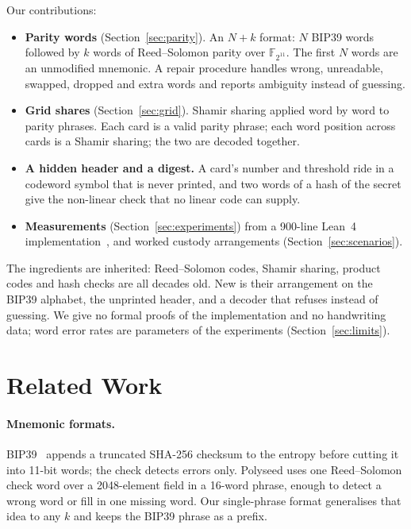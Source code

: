 \documentclass[numeric]{anvil-paper}
\newcommand{\F}{\mathbb{F}}
\begin{document}
Our contributions:
\begin{itemize}
\item \textbf{Parity words} (Section~\ref{sec:parity}). An $N{+}k$ format: $N$
  BIP39 words followed by $k$ words of Reed--Solomon parity over $\F_{2^{11}}$.
  The first $N$ words are an unmodified mnemonic. A repair procedure handles
  wrong, unreadable, swapped, dropped and extra words and reports ambiguity
  instead of guessing.
\item \textbf{Grid shares} (Section~\ref{sec:grid}). Shamir sharing applied word
  by word to parity phrases. Each card is a valid parity phrase; each word
  position across cards is a Shamir sharing; the two are decoded together.
\item \textbf{A hidden header and a digest.} A card's number and threshold ride
  in a codeword symbol that is never printed, and two words of a hash of the
  secret give the non-linear check that no linear code can supply.
\item \textbf{Measurements} (Section~\ref{sec:experiments}) from a 900-line
  Lean~4 implementation~\citep{moura2021lean}, and worked custody arrangements
  (Section~\ref{sec:scenarios}).
\end{itemize}
The ingredients are inherited: Reed--Solomon codes, Shamir sharing, product
codes and hash checks are all decades old. New is their arrangement on the BIP39
alphabet, the unprinted header, and a decoder that refuses instead of guessing.
We give no formal proofs of the implementation and no handwriting data; word
error rates are parameters of the experiments
(Section~\ref{sec:limits}).

\section{Related Work}
\label{sec:related}

\paragraph{Mnemonic formats.}
BIP39~\citep{bip39} appends a truncated SHA-256 checksum to the entropy before
cutting it into 11-bit words; the check detects errors only. Polyseed
\citep{polyseed} uses one Reed--Solomon check word over a 2048-element field in
a 16-word phrase, enough to detect a wrong word or fill in one missing word.
Our single-phrase format generalises that idea to any $k$ and keeps the BIP39
phrase as a prefix.
\end{document}
